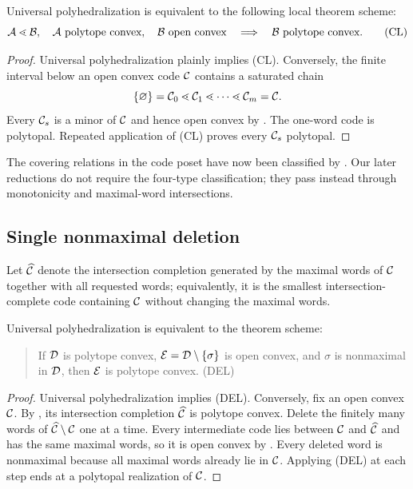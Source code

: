 \begin{theorem}
\label{thm:saturated-chain}
Universal polyhedralization is equivalent to the following local theorem scheme:
\[
 \mathcal A\lessdot\mathcal B,
 \quad \mathcal A\text{ polytope convex},
 \quad \mathcal B\text{ open convex}
 \quad\Longrightarrow\quad
 \mathcal B\text{ polytope convex}.
 \tag{CL}
\]
\end{theorem}

\begin{proof}
Universal polyhedralization plainly implies (CL).  Conversely, the finite interval below an open convex code $\mathcal C$ contains a saturated chain
\[
 \{\varnothing\}=\mathcal C_0\lessdot\mathcal C_1\lessdot\cdots\lessdot\mathcal C_m=\mathcal C.
\]
Every $\mathcal C_s$ is a minor of $\mathcal C$ and hence open convex by .  The one-word code is polytopal.  Repeated application of (CL) proves every $\mathcal C_s$ polytopal.
\end{proof}

The covering relations in the code poset have now been classified by \citet{JeffsTrang2025}.  Our later reductions do not require the four-type classification; they pass instead through monotonicity and maximal-word intersections.

\subsection{Single nonmaximal deletion}

Let $\widehat{\mathcal C}$ denote the intersection completion generated by the maximal words of $\mathcal C$ together with all requested words; equivalently, it is the smallest intersection-complete code containing $\mathcal C$ without changing the maximal words.

\begin{theorem}
\label{thm:single-deletion}
Universal polyhedralization is equivalent to the theorem scheme:
\begin{quote}
If $\mathcal D$ is polytope convex, $\mathcal E=\mathcal D\setminus\{\sigma\}$ is open convex, and $\sigma$ is nonmaximal in $\mathcal D$, then $\mathcal E$ is polytope convex. \hfill(DEL)
\end{quote}
\end{theorem}

\begin{proof}
Universal polyhedralization implies (DEL).  Conversely, fix an open convex $\mathcal C$.  By , its intersection completion $\widehat{\mathcal C}$ is polytope convex.  Delete the finitely many words of $\widehat{\mathcal C}\setminus\mathcal C$ one at a time.  Every intermediate code lies between $\mathcal C$ and $\widehat{\mathcal C}$ and has the same maximal words, so it is open convex by .  Every deleted word is nonmaximal because all maximal words already lie in $\mathcal C$.  Applying (DEL) at each step ends at a polytopal realization of $\mathcal C$.
\end{proof}

